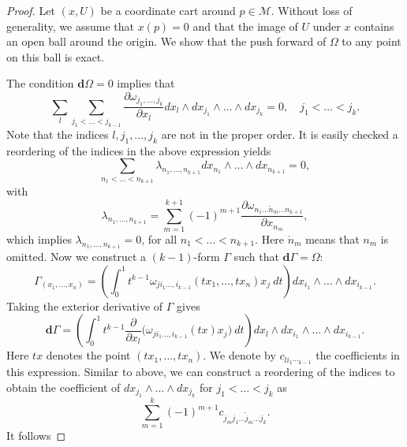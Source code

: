 \begin{proof}
Let $(x,U)$ be a coordinate cart around $p\in \mathcal M$. Without loss of generality, we assume that $x(p)=0$ and that the image of $U$ under $x$ contains an open ball around the origin. We show that the push forward of $\Omega$ to any point on this ball is exact.

The condition $\mathbf d \Omega = 0$ implies that
\begin{equation*}
	\sum_l \sum_{j_1<\dots<j_{k-1}} \frac{\partial \omega_{j_1,\dots,j_k}}{\partial x_l} dx_l\wedge dx_{j_1}\wedge \dots \wedge dx_{j_k} = 0, \quad j_1<\dots<j_k.
\end{equation*}
Note that the indices $l,j_1,\dots,j_k$ are not in the proper order. It is easily checked a reordering of the indices in the above expression yields
\begin{equation*}
	\sum_{n_1<\dots<n_{k+1}}\lambda_{n_1,\dots,n_{k+1}} dx_{n_1}\wedge \dots \wedge dx_{n_{k+1}} = 0,
\end{equation*}
with
\begin{equation*}
	\lambda_{n_1,\dots,n_{k+1}} = \sum_{m=1}^{k+1} (-1)^{m+1} \frac{\partial \omega_{n_1\dots\mathring n_m \dots n_{k+1}}}{\partial x_{n_m}},
\end{equation*}
which implies $\lambda_{n_1,\dots,n_{k+1}} = 0$, for all $n_1<\dots<n_{k+1}$. Here $\mathring n_m$ means that $n_m$ is omitted. Now we construct a $(k-1)$-form $\Gamma$ such that $\mathbf d \Gamma = \Omega$:
\begin{equation*}
	\Gamma_{(x_1,\dots,x_n)} = \left( \int_0^1 t^{k-1} \omega_{ji_1\dots,i_{k-1}}(tx_1,\dots,tx_n) x_j \ dt \right) dx_{i_1}\wedge \dots \wedge dx_{i_{k-1}}.
\end{equation*}
Taking the exterior derivative of $\Gamma$ gives
\begin{equation*}
	\mathbf d \Gamma = \left( \int_0^1 t^{k-1} \frac{\partial }{\partial x_l} \big( \omega_{ji_1\dots,i_{k-1}}(tx) x_j \big) \ dt \right) dx_l\wedge dx_{i_1}\wedge \dots \wedge dx_{i_{k-1}}.
\end{equation*}
Here $tx$ denotes the point $(tx_1,\dots,tx_n)$. We denote by $c_{li_1\dotsi_{k-1}}$ the coefficients in this expression. Similar to above, we can construct a reordering of the indices to obtain the coefficient of $dx_{j_1}\wedge\dots\wedge dx_{j_k}$ for $j_1<\dots<j_{k}$ as
\begin{equation*}
	\sum_{m=1}^{k} (-1)^{m+1} c_{j_mj_1\dots\mathring j_{m}\dots j_k}.
\end{equation*}
It follows

\end{proof}
